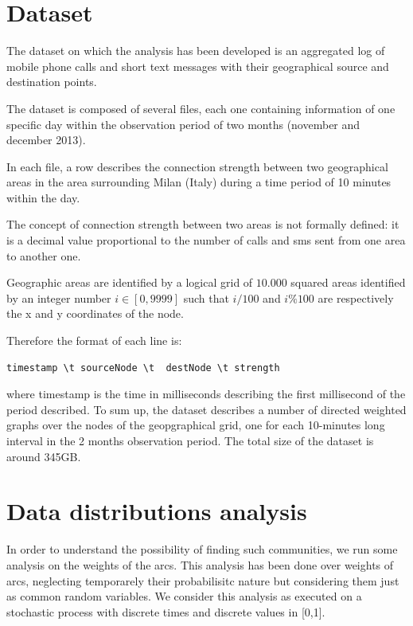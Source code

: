 \section{Dataset}
\label{thedataset}

The dataset on which the analysis has been developed is an aggregated log of mobile phone
calls and short text messages with their geographical source and destination points.

The dataset is composed of several files, each one containing information of one specific day
within the observation period of two months (november and december 2013).


In each file, a row describes the connection strength between two geographical areas in the area surrounding Milan (Italy) during a time period of 10 minutes within the day.

The concept of connection strength between two areas is not formally defined: it is a decimal value proportional to the number of calls and sms sent from one area to another one.

Geographic areas are identified by a logical grid of $10.000$ squared areas 
identified by an integer number $i \in [0, 9999]$ such that
$ i / 100 $ and $ i \% 100 $ are respectively the  
x and y coordinates of the node.

Therefore the format of each line is:

\begin{verbatim}
timestamp \t sourceNode	\t 	destNode \t strength
\end{verbatim}

where timestamp is the time in milliseconds describing the first millisecond of the period described.
To sum up, the dataset describes a number of directed weighted graphs over
the nodes of the geopgraphical grid, one for each 10-minutes long interval
in the 2 months observation period. The total size of the dataset is around 345GB.

\section{Data distributions analysis}
\label{ds_analysis}

In order to understand the possibility of finding such communities, 
we run some analysis on the weights of the arcs.
This analysis has been done over weights of arcs, 
neglecting temporarely their probabilisitc nature but considering
them just as common random variables.
We consider this analysis as executed on a stochastic process with discrete times and discrete values in [0,1].

